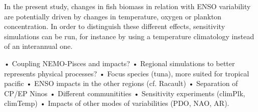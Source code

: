 In the present study, changes in fish biomass in relation with ENSO variability are potentially driven by changes in temperature, oxygen or plankton concentration. In order to distinguish these different effects, sensitivity simulations can be run, for instance by using a temperature climatology instead of an interannual one. 

• Coupling NEMO-Pisces and impacts?  %
• Regional simulations to better represents physical processes? %
• Focus species (tuna), more suited for tropical pacific
• ENSO impacts in the other regions (cf. Racault)  
• Separation of CP/EP Ninos  %
• Different communitities
• Sensitivity experiments (climPlk, climTemp)
• Impacts of other modes of variabilities (PDO, NAO, AR).


